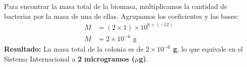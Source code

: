 \documentclass[12pt]{article}
\begin{document}
\begin{tcolorbox}
\begin{center}
    \end{center}

    \vspace{0.4cm}
    \begin{tcolorbox}[colback=medteal!10, colframe=medteal, arc=2mm, boxrule=1.2pt, title=\textbf{Desarrollo Matemático y Solución}]
        Para encontrar la masa total de la biomasa, multiplicamos la cantidad de bacterias por la masa de una de ellas. Agrupamos los coeficientes y las bases:
        \begin{align*}
            M &= (2 \times 1) \times 10^{6 + (-12)} \\[1ex]
            M &= 2 \times 10^{-6} \text{ g}
        \end{align*}
        \textbf{Resultado:} La masa total de la colonia es de \textbf{$2 \times 10^{-6}$ g}, lo que equivale en el Sistema Internacional a \textbf{2 microgramos ($\mu$g)}.
    \end{tcolorbox}
    
\end{tcolorbox}
\end{document}
